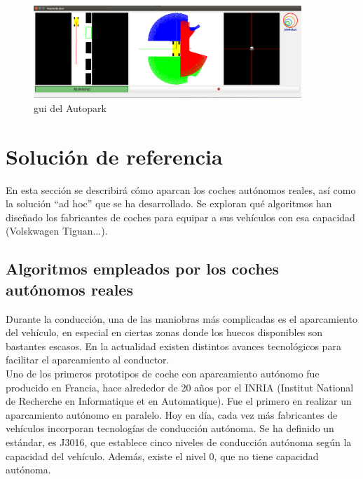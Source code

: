\begin{figure}[H]
  \begin{center}
    \includegraphics[width=0.9\textwidth]{figures/Autopark/GUI_Autopark.png}
		\caption{\acrshort{gui} del Autopark}
		\label{fig.GUI_Autopark}
		\end{center}
\end{figure}

\section{Solución de referencia}
En esta sección se describirá cómo aparcan los coches autónomos reales, así como la solución ``ad hoc'' que se ha desarrollado. Se exploran qué algoritmos han diseñado los fabricantes de coches para equipar a sus vehículos con esa capacidad (Volskwagen Tiguan...).

\subsection{Algoritmos empleados por los coches autónomos reales}
Durante la conducción, una de las maniobras más complicadas es el aparcamiento del vehículo, en especial en ciertas zonas donde los huecos disponibles son bastantes escasos. En la actualidad existen distintos avances tecnológicos para facilitar el aparcamiento al conductor.\\


Uno de los primeros prototipos de coche con aparcamiento autónomo fue producido en Francia, hace alrededor de 20 años por el INRIA (Institut National de Recherche en Informatique et en Automatique). Fue el primero en realizar un aparcamiento autónomo en paralelo. Hoy en día, cada vez más fabricantes de vehículos incorporan tecnologías de conducción autónoma. Se ha definido un estándar, es J3016, que establece cinco niveles de conducción autónoma según la capacidad del vehículo. Además, existe el nivel 0, que no tiene capacidad autónoma.

